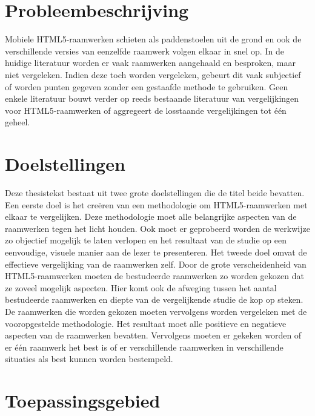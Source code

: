 \section{Probleembeschrijving} %
Mobiele HTML5-raamwerken schieten als paddenstoelen uit de grond en ook de verschillende versies van eenzelfde raamwerk volgen elkaar in snel op.
In de huidige literatuur worden er vaak raamwerken aangehaald en besproken, maar niet vergeleken.
Indien deze toch worden vergeleken, gebeurt dit vaak subjectief of worden punten gegeven zonder een gestaafde methode te gebruiken.
Geen enkele literatuur bouwt verder op reeds bestaande literatuur van vergelijkingen voor HTML5-raamwerken of aggregeert de losstaande vergelijkingen tot één geheel.

\section{Doelstellingen} %
Deze thesistekst bestaat uit twee grote doelstellingen die de titel beide bevatten.
Een eerste doel is het creëren van een methodologie om HTML5-raamwerken met elkaar te vergelijken.
Deze methodologie moet alle belangrijke aspecten van de raamwerken tegen het licht houden.
Ook moet er geprobeerd worden de werkwijze zo objectief mogelijk te laten verlopen en het resultaat van de studie op een eenvoudige,  visuele manier aan de lezer te presenteren.
Het tweede doel omvat de effectieve vergelijking van de raamwerken zelf.
Door de grote verscheidenheid van HTML5-raamwerken moeten de bestudeerde raamwerken zo worden gekozen dat ze zoveel mogelijk aspecten.
Hier komt ook de afweging tussen het aantal bestudeerde raamwerken en diepte van de vergelijkende studie de kop op steken.
De raamwerken die worden gekozen moeten vervolgens worden vergeleken met de vooropgestelde methodologie.
Het resultaat moet alle positieve en negatieve aspecten van de raamwerken bevatten.
Vervolgens moeten er gekeken worden of er één raamwerk het best is of er verschillende raamwerken in verschillende situaties als best kunnen worden bestempeld.

\section{Toepassingsgebied} %

